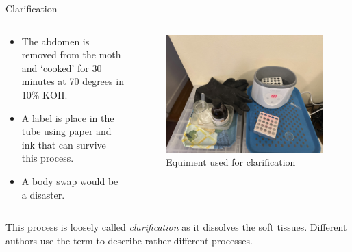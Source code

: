 \documentclass[
  ignorenonframetext,
]{beamer}
\providecommand{\tightlist}{%
  \setlength{\itemsep}{0pt}\setlength{\parskip}{0pt}}
\begin{document}
\begin{frame}{Clarification}
\protect\hypertarget{clarification}{}
\begin{columns}[T]
\begin{column}{0.5\textwidth}
\begin{itemize}
\tightlist
\item
  The abdomen is removed from the moth and `cooked' for 30 minutes at 70
  degrees in 10\% KOH.
\item
  A label is place in the tube using paper and ink that can survive this
  process.
\item
  A body swap would be a disaster.
\end{itemize}
\end{column}

\begin{column}{0.5\textwidth}
\begin{figure}
\centering
\includegraphics{./images/clarification.jpg}
\caption{Equiment used for clarification}
\end{figure}
\end{column}
\end{columns}

This process is loosely called \emph{clarification} as it dissolves the
soft tissues. Different authors use the term to describe rather
different processes.
\end{frame}
\end{document}
